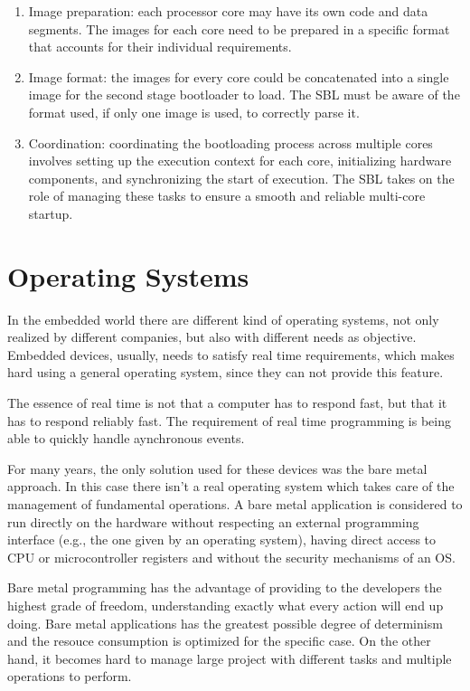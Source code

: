 \begin{enumerate}
    \item   Image preparation: each processor core may have its own code and
            data segments. The images for each core need to be prepared in a
            specific format that accounts for their individual requirements.

    \item   Image format: the images for every core could be concatenated into
            a single image for the second stage bootloader to load.
            The SBL must be aware of the format used, if only one image is
            used, to correctly parse it.

    \item   Coordination: coordinating the bootloading process across multiple
            cores involves setting up the execution context for each core,
            initializing hardware components, and synchronizing the start of
            execution. The SBL takes on the role of managing these tasks to
            ensure a smooth and reliable multi-core startup.
\end{enumerate}

\section{Operating Systems}

In the embedded world there are different kind of operating systems, not only
realized by different companies, but also with different needs as objective.
Embedded devices, usually, needs to satisfy real time requirements, which
makes hard using a general operating system, since they can not provide
this feature.

The essence of real time is not that a computer has to respond fast, but that
it has to respond reliably fast.
The requirement of real time programming is being able to quickly handle
aynchronous events. \cite{abbott2011linux} 

For many years, the only solution used for these devices was the bare metal
approach. In this case there isn't a real operating system which takes care
of the management of fundamental operations.
A bare metal application is considered to run directly on the hardware without
respecting an external programming interface 
(e.g., the one given by an operating system), having direct access to CPU
or microcontroller registers and without the security mechanisms of an OS.

Bare metal programming has the advantage of providing to the developers the
highest grade of freedom, understanding exactly what every action will end up
doing. Bare metal applications has the greatest possible degree of 
determinism and the resouce consumption is optimized for the specific case. 
On the other hand, it becomes hard to manage large project with different tasks
and multiple operations to perform.

